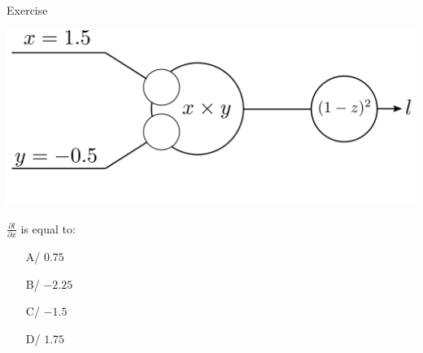 \documentclass[xcolor=pdftex,dvipsnames,table,mathserif]{beamer}
\begin{document}
\begin{frame}{Exercise}

  \includegraphics[width=\textwidth]{bp_2_1_neuron_exo.png}


  $\frac{\partial l}{\partial x}$ is equal to:

    \begin{itemize}
  \item[A/] $0.75$
  \item[B/] $-2.25$
  \item[C/] $-1.5$
  \item[D/] $1.75$
  \end{itemize}





\end{frame}
\end{document}
